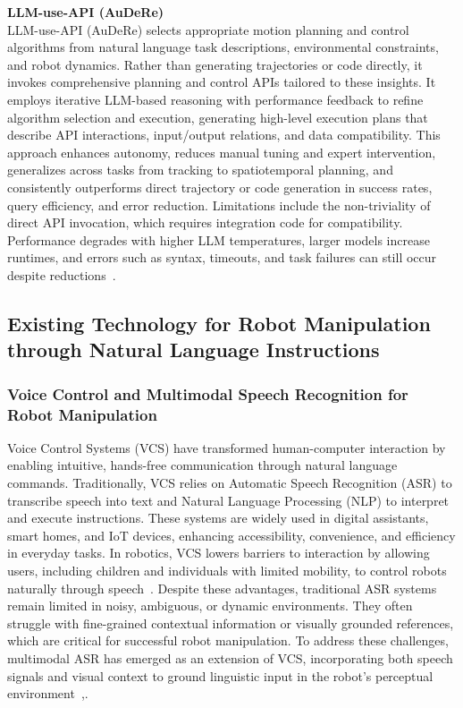 \documentclass[12pt]{extarticle}
\begin{document}
\textbf{LLM-use-API (AuDeRe)} \\
LLM-use-API (AuDeRe) selects appropriate motion planning and control algorithms from natural language task descriptions, environmental constraints, and robot dynamics. Rather than generating trajectories or code directly, it invokes comprehensive planning and control APIs tailored to these insights. It employs iterative LLM-based reasoning with performance feedback to refine algorithm selection and execution, generating high-level execution plans that describe API interactions, input/output relations, and data compatibility. This approach enhances autonomy, reduces manual tuning and expert intervention, generalizes across tasks from tracking to spatiotemporal planning, and consistently outperforms direct trajectory or code generation in success rates, query efficiency, and error reduction. Limitations include the non-triviality of direct API invocation, which requires integration code for compatibility. Performance degrades with higher LLM temperatures, larger models increase runtimes, and errors such as syntax, timeouts, and task failures can still occur despite reductions~\cite{audere}.

\subsection{Existing Technology for Robot Manipulation through Natural Language Instructions}

\subsubsection{Voice Control and Multimodal Speech Recognition for Robot Manipulation}

Voice Control Systems (VCS) have transformed human-computer interaction by enabling intuitive, hands-free communication through natural language commands. Traditionally, VCS relies on Automatic Speech Recognition (ASR) to transcribe speech into text and Natural Language Processing (NLP) to interpret and execute instructions. These systems are widely used in digital assistants, smart homes, and IoT devices, enhancing accessibility, convenience, and efficiency in everyday tasks. In robotics, VCS lowers barriers to interaction by allowing users, including children and individuals with limited mobility, to control robots naturally through speech~\cite{vcs}. Despite these advantages, traditional ASR systems remain limited in noisy, ambiguous, or dynamic environments. They often struggle with fine-grained contextual information or visually grounded references, which are critical for successful robot manipulation. To address these challenges, multimodal ASR has emerged as an extension of VCS, incorporating both speech signals and visual context to ground linguistic input in the robot’s perceptual environment~\cite{Chang2023},\cite{multi}.
\end{document}
